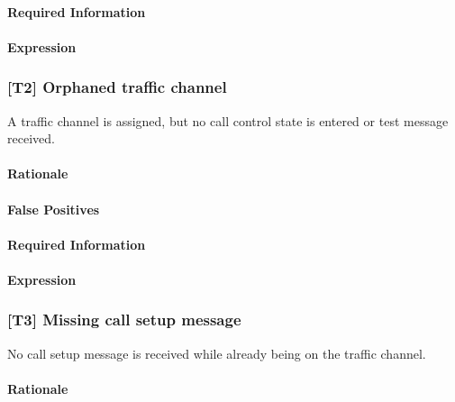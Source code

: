 \documentclass[a4paper,11pt,notitlepage,bigheadings,oneside]{scrartcl}
\begin{document}
\TBD{}

\paragraph{Required Information}

\TBD{}

\paragraph{Expression}

\TBD{}

\subsubsection{[T2] Orphaned traffic channel}

A traffic channel is assigned, but no call control state is entered or test
message received.

\paragraph{Rationale}

\TBD{}

\paragraph{False Positives}

\TBD{}

\paragraph{Required Information}

\TBD{}

\paragraph{Expression}

\TBD{}


\subsubsection{[T3] Missing call setup message}

No call setup message is received while already being on the traffic channel.

\paragraph{Rationale}
\end{document}
